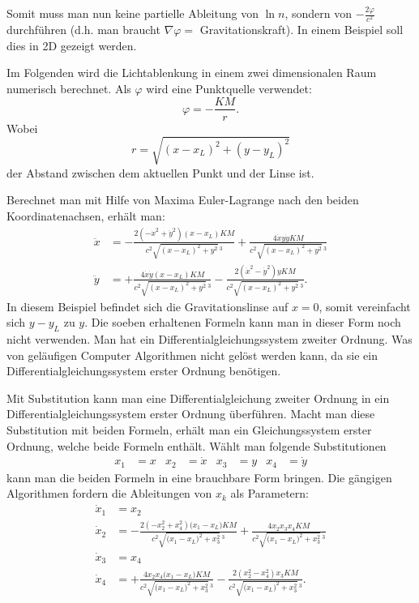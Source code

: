 \begin{refsection}
Somit muss man nun keine partielle Ableitung von \(\ln n\), sondern von
\(-\frac{2\varphi}{c^2}\) durchführen (d.h. man braucht
\(\nabla\varphi=\) Gravitationskraft).  In einem Beispiel soll dies in
2D gezeigt werden.

\begin{beispiel}
  Im Folgenden wird die Lichtablenkung in einem zwei dimensionalen
  Raum numerisch berechnet.  Als \(\varphi\) wird eine Punktquelle
  verwendet:
  \begin{equation*}
    \varphi = -\frac{KM}{r}.
  \end{equation*}
  Wobei
  \begin{equation*}
    r = \sqrt{(x-x_L)^2+(y-y_L)^2}
  \end{equation*}
  der Abstand zwischen dem aktuellen Punkt und der Linse ist.

  Berechnet man mit Hilfe von Maxima Euler-Lagrange nach den beiden
%
  Koordinatenachsen, erhält man:
  \begin{align*}
    \ddot{x} &= -\frac{2(-\dot{x}^2+\dot{y}^2)(x-x_L)KM}
               {c^2\sqrt{(x-x_L)^2+y^2}\,^3}+
               \frac{4\dot{x}y\dot{y}KM}{c^2\sqrt{(x-x_L)^2+y^2}\,^3}\\
    \ddot{y} &= +\frac{4\dot{x}\dot{y}(x-x_L)KM}{c^2\sqrt{(x-x_L)^2+y^2}\,^3}
               - \frac{2(\dot{x}^2-\dot{y}^2)yKM}
               {c^2\sqrt{(x-x_L)^2+y^2}\,^3}.
  \end{align*}
  In diesem Beispiel befindet sich die Gravitationslinse auf \(x=0\),
  somit vereinfacht sich \(y-y_L\) zu \(y\).  Die soeben erhaltenen
  Formeln kann man in dieser Form noch nicht verwenden.  Man hat ein
  Differentialgleichungssystem zweiter Ordnung.  Was von geläufigen
  Computer Algorithmen nicht gelöst werden kann, da sie ein Differentialgleichungssystem
  erster Ordnung benötigen.

  Mit Substitution kann man eine Differentialgleichung zweiter Ordnung
  in ein Differentialgleichungssystem erster Ordnung überführen.  Macht man diese
  Substitution mit beiden Formeln, erhält man ein Gleichungssystem
  erster Ordnung, welche beide Formeln enthält.  Wählt man folgende
  Substitutionen
  \begin{align*}
    x_1 &= x &x_2 &= \dot{x} &x_3 &= y &x_4 &= \dot{y}
  \end{align*}
  kann man die beiden Formeln in eine brauchbare Form bringen.  Die
  gängigen Algorithmen fordern die Ableitungen von \(x_k\) als
  Parametern:
  \begin{align*}
    \dot{x}_1 &= x_2\\
    \dot{x}_2 &= -\frac{2\left(-x_2^2+x_4^2\right)\bigl(x_1-x_L\bigr)KM}
                {c^2\sqrt{\bigl(x_1-x_L\bigr)^2+x_3^2}\,^3}
                + \frac{4 x_2x_3x_4 KM}
                {c^2\sqrt{\bigl(x_1-x_L\bigr)^2+x_3^2}\,^3}\\
    \dot{x}_3 &= x_4\\
    \dot{x}_4 &= +\frac{4x_2x_4\bigl(x_1-x_L\bigr)KM}
                {c^2\sqrt{\bigl(x_1-x_L\bigr)^2+x_3^2}\,^3}
                - \frac{2 \left(x_2^2-x_4^2\right) x_3 KM}
                {c^2\sqrt{\bigl(x_1-x_L\bigr)^2+x_3^2}\,^3}.
  \end{align*}


\end{beispiel}
\end{refsection}
